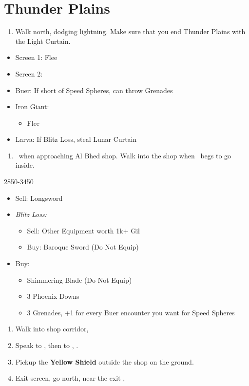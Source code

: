 \chapter{Thunder Plains}

\begin{enumerate}
  \item Walk north, dodging lightning. Make sure that you end Thunder Plains with the Light Curtain.
\end{enumerate}
\begin{encounters}
  \begin{itemize}
    \item Screen 1: Flee
    \item Screen 2:
    \item Buer: If short of Speed Spheres, can throw Grenades
    \item Iron Giant:
          \begin{itemize}
            \rikkuf Steal Light Curtain
            \item Flee
          \end{itemize}
    \item Larva: If Blitz Loss, steal Lunar Curtain
  \end{itemize}
\end{encounters}
\begin{enumerate}[resume]
  \item \sd\ when approaching Al Bhed shop. Walk into the shop when \rikku\ begs to go inside.
\end{enumerate}
\begin{shop}{2850-3450}
  \begin{itemize}
    \item Sell: Longsword
    \item \textit{Blitz Loss:}
          \begin{itemize}
            \item Sell: Other Equipment worth 1k+ Gil
            \item Buy: Baroque Sword (Do Not Equip)
          \end{itemize}
    \item Buy:
          \begin{itemize}
            \item Shimmering Blade (Do Not Equip)
            \item 3 Phoenix Downs
            \item 3 Grenades, +1 for every Buer encounter you want for Speed Spheres
          \end{itemize}
  \end{itemize}
\end{shop}
\begin{enumerate}[resume]
  \item Walk into shop corridor, \cs[2:00]
  \item Speak to \auron, then to \rikku, \sd.
  \item Pickup the \textbf{Yellow Shield} outside the shop on the ground.
  \item Exit screen, go north, near the exit \sd, \cs[3:10]
\end{enumerate}